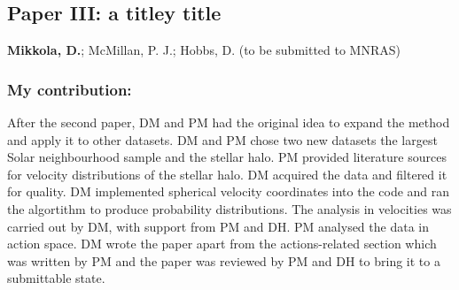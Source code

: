 \subsection*{Paper III: a titley title}
\textbf{Mikkola, D.}; McMillan, P. J.; Hobbs, D. (to be submitted to MNRAS) \newline

\subsubsection*{My contribution:}
After the second paper, DM and PM had the original idea to expand the method and apply it to other datasets. DM and PM chose two new datasets the largest Solar neighbourhood sample and the stellar halo. PM provided literature sources for velocity distributions of the stellar halo. DM acquired the data and filtered it for quality. DM implemented spherical velocity coordinates into the code and ran the algortithm to produce probability distributions. The analysis in velocities was carried out by DM, with support from PM and DH. PM analysed the data in action space. DM wrote the paper apart from the actions-related section which was written by PM and the paper was reviewed by PM and DH to bring it to a submittable state.